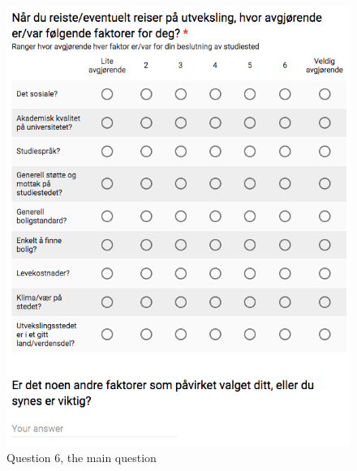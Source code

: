 \begin{figure}[h]
    \centering
    
\includegraphics[width=1\textwidth]{fig/form1/main.png}
    \caption[]{Question 6, the main question}
    \label{fig:q16}
\end{figure}



